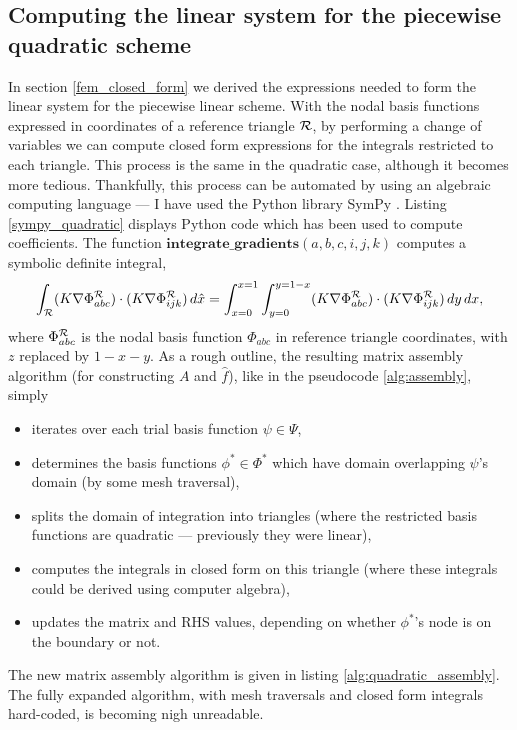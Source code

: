 \subsection{Computing the linear system for the piecewise quadratic scheme}
In section \ref{fem_closed_form} we derived the expressions needed to form the linear system for the piecewise linear scheme.
With the nodal basis functions expressed in coordinates of a reference triangle ${\mathcal{R}}$,
by performing a change of variables we can compute closed form expressions for the integrals restricted to each triangle.
This process is the same in the quadratic case, although it becomes more tedious.
Thankfully, this process can be automated by using an algebraic computing language --- I have used the Python library SymPy
\cite{sympy}. Listing \ref{sympy_quadratic} displays Python code which has been used to compute coefficients.
The function $\textbf{integrate\_gradients}(a,b,c, i,j,k)$ computes a symbolic definite integral,
\begin{equation}
     \int_{\mathcal{R}} (K\nabla\Phi^{\mathcal{R}}_{abc})\cdot(K\nabla\Phi^{\mathcal{R}}_{ijk})\,d\hat{x}
    = \int_{x=0}^{x=1}\int_{y=0}^{y=1-x} (K\nabla\Phi^{\mathcal{R}}_{abc})\cdot(K\nabla\Phi^{\mathcal{R}}_{ijk})\,dy\,dx,
\end{equation}
where $\Phi^{\mathcal{R}}_{abc}$ is the nodal basis function $\Phi_{abc}$ in reference triangle coordinates, with $z$ replaced by $1-x-y$.
As a rough outline, the resulting matrix assembly algorithm (for constructing $A$ and $\hat{f}$), like in the pseudocode \ref{alg:assembly},
simply
\begin{itemize}
    \item iterates over each trial basis function $\psi \in \Psi$,
    \item determines the basis functions $\phi^* \in \Phi^*$ which have domain overlapping $\psi$'s domain (by some mesh traversal),
    \item splits the domain of integration into triangles (where the restricted basis functions are quadratic --- previously they were linear),
    \item computes the integrals in closed form on this triangle (where these integrals could be derived using computer algebra),
    \item updates the matrix and RHS values, depending on whether $\phi^*$'s node is on the boundary or not.
\end{itemize}
The new matrix assembly algorithm is given in listing \ref{alg:quadratic_assembly}.
The fully expanded algorithm, with mesh traversals and closed form integrals hard-coded, is becoming nigh unreadable.
